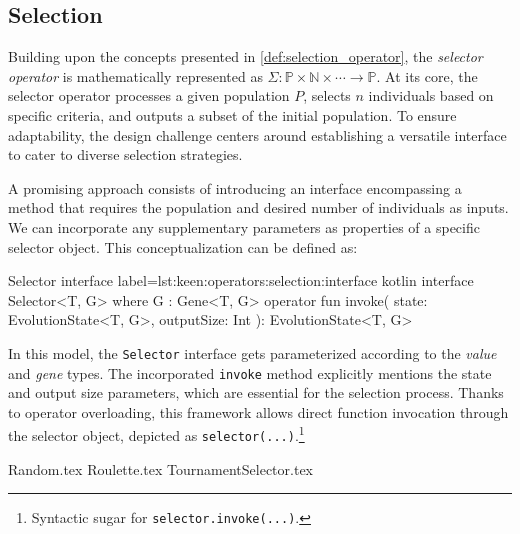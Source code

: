 \subsection{Selection}
\label{sec:keen:operators:selection}
  Building upon the concepts presented in \vref{def:selection_operator}, the \emph{selector operator} is mathematically 
  represented as \(\Sigma : \mathbb{P} \times \mathbb{N} \times \cdots \to \mathbb{P}\).
  At its core, the selector operator processes a given population \(P\), selects \(n\) individuals based on specific 
  criteria, and outputs a subset of the initial population. To ensure adaptability, the design challenge centers around 
  establishing a versatile interface to cater to diverse selection strategies.

  A promising approach consists of introducing an interface encompassing a method that requires the population and 
  desired number of individuals as inputs. We can incorporate any supplementary parameters as properties of a specific 
  selector object. This conceptualization can be defined as:

  \begin{code}{Selector interface}{
    label=lst:keen:operators:selection:interface
  }{kotlin}
    interface Selector<T, G> where G : Gene<T, G> {
        operator fun invoke(
            state: EvolutionState<T, G>, outputSize: Int
        ): EvolutionState<T, G>
    }
  \end{code}

  In this model, the \texttt{Selector} interface gets parameterized according to the \textit{value} and \textit{gene} 
  types. The incorporated \texttt{invoke} method explicitly mentions the state and output size parameters, which are 
  essential for the selection process. Thanks to operator overloading, this framework allows direct function invocation 
  through the selector object, depicted as \texttt{selector(...)}.\footnote{Syntactic sugar for 
  \texttt{selector.invoke(...)}.}

  {Random.tex}
  {Roulette.tex}
  {TournamentSelector.tex}
